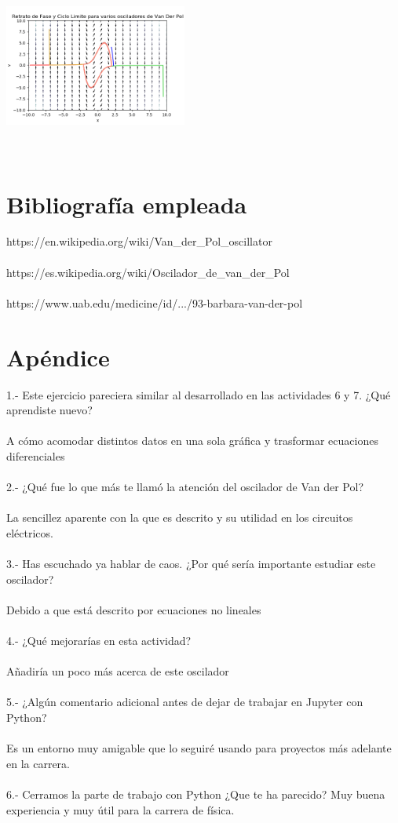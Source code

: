 \documentclass{article}
\begin{document}
\begin{center}
    \includegraphics[width=6cm, height=6cm]{Van5.png}
\end{center}

\section{Bibliografía empleada}
https://en.wikipedia.org/wiki/Van_der_Pol_oscillator
\\
\\
https://es.wikipedia.org/wiki/Oscilador_de_van_der_Pol
\\
\\
https://www.uab.edu/medicine/id/.../93-barbara-van-der-pol


\section{Apéndice}

1.- Este ejercicio pareciera similar al desarrollado en las actividades 6 y 7. ¿Qué aprendiste nuevo?
\\
\\
A cómo acomodar distintos datos en una sola gráfica y trasformar ecuaciones diferenciales
\\
\\
2.- ¿Qué fue lo que más te llamó la atención del oscilador de Van der Pol?
\\
\\
La sencillez aparente con la que es descrito y su utilidad en los circuitos eléctricos.
\\
\\
3.- Has escuchado ya hablar de caos. ¿Por qué sería importante estudiar este oscilador?
\\
\\
Debido a que está descrito por ecuaciones no lineales
\\
\\
4.- ¿Qué mejorarías en esta actividad?
\\
\\
Añadiría un poco más acerca de este oscilador
\\
\\
5.- ¿Algún comentario adicional antes de dejar de trabajar en Jupyter con Python?
\\
\\
Es un entorno muy amigable que lo seguiré usando para proyectos más adelante en la carrera.
\\
\\
6.- Cerramos la parte de trabajo con Python ¿Que te ha parecido?
Muy buena experiencia y muy útil para la carrera de física.
\end{document}
